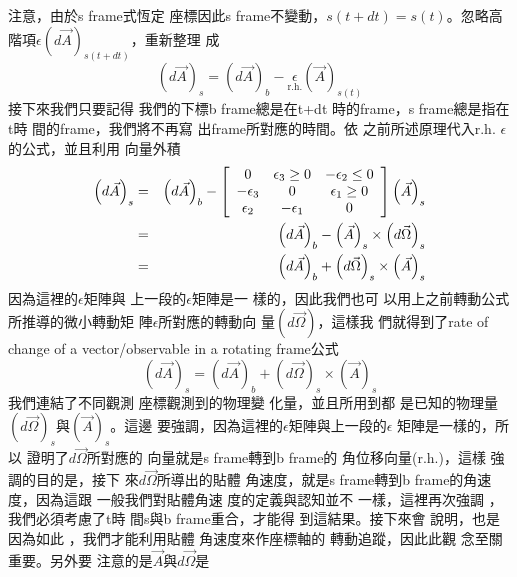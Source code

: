 \documentclass[12pt,twoside]{article}
\begin{document}
注意，由於s frame式恆定%
座標因此s frame不變動，$%
s(t+dt)=s(t)$。忽略高階項$\epsilon
\left( d\vec{A}\right) _{s(t+dt)}$，重新整理%
成%
\begin{equation*}
\left( d\vec{A}\right) _{s}=\left( d\vec{A}\right) _{b}-\underset{\text{r.h.}%
}{\epsilon }\left( \vec{A}\right) _{s(t)}
\end{equation*}%
接下來我們只要記得%
我們的下標b frame總是在t+dt%
時的frame，s frame總是指在t時%
間的frame，我們將不再寫%
出frame所對應的時間。依%
之前所述原理代入r.h. $%
\epsilon $的公式，並且利用%
向量外積%
\begin{eqnarray}
\left( d\vec{A}\right) _{s} &=&\left( d\vec{A}\right) _{b}-\left[ 
\begin{array}{ccc}
0 & \epsilon _{3}\geq 0 & -\epsilon _{2}\leq 0 \\ 
-\epsilon _{3} & 0 & \epsilon _{1}\geq 0 \\ 
\epsilon _{2} & -\epsilon _{1} & 0%
\end{array}%
\right] \left( \vec{A}\right) _{s}  \notag \\
&=&\left( d\vec{A}\right) _{b}-\left( \vec{A}\right) _{s}\times \left( d\vec{%
\Omega}\right) _{s}  \label{roc3} \\
&=&\left( d\vec{A}\right) _{b}+\left( d\vec{\Omega}\right) _{s}\times \left( 
\vec{A}\right) _{s}  \notag
\end{eqnarray}%
因為這裡的$\epsilon $矩陣與%
上一段的$\epsilon $矩陣是一%
樣的，因此我們也可%
以用上之前轉動公式%
所推導的微小轉動矩%
陣$\epsilon $所對應的轉動向%
量$\left( d\vec{\Omega}\right) $，這樣我%
們就得到了rate of change of a
vector/observable in a rotating frame公式%
\begin{equation}
\left( d\vec{A}\right) _{s}=\left( d\vec{A}\right) _{b}+\left( d\vec{\Omega}%
\right) _{s}\times \left( \vec{A}\right) _{s}  \label{rateofdomega}
\end{equation}%
我們連結了不同觀測%
座標觀測到的物理變%
化量，並且所用到都%
是已知的物理量$\left( d\vec{\Omega}%
\right) _{s}$與$\left( \vec{A}\right) _{s}$。這邊%
要強調，因為這裡的$%
\epsilon $矩陣與上一段的$\epsilon $%
矩陣是一樣的，所以%
證明了$d\vec{\Omega}$所對應的%
向量就是s frame轉到b frame的%
角位移向量(r.h.)，這樣%
強調的目的是，接下%
來$d\vec{\Omega}$所導出的貼體%
角速度，就是s frame轉到b
frame的角速度，因為這跟%
一般我們對貼體角速%
度的定義與認知並不%
一樣，這裡再次強調%
，我們必須考慮了t時%
間s與b frame重合，才能得%
到這結果。接下來會%
說明，也是因為如此%
，我們才能利用貼體%
角速度來作座標軸的%
轉動追蹤，因此此觀%
念至關重要。另外要%
注意的是$\vec{A}$與$d\vec{\Omega}$是%
\end{document}
